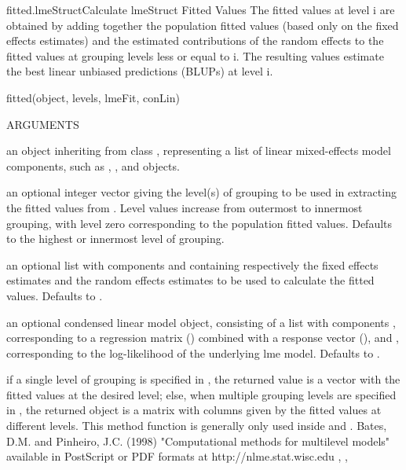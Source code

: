 \documentclass[pdftex]{article} \usepackage{url,graphicx}
\begin{document}
\begin{Helpfile}{fitted.lmeStruct}{Calculate lmeStruct Fitted Values}
The fitted values at level i are obtained by adding together the
population fitted values (based only on the fixed effects estimates)
and the estimated contributions of the random effects to the fitted
values at grouping levels less or equal to i. The resulting
values estimate the best linear unbiased predictions (BLUPs) at level
i.
\begin{Example}
fitted(object, levels, lmeFit, conLin)
\end{Example}
\begin{Argument}{ARGUMENTS}
\item[\Co{object:}]
an object inheriting from class ,
representing a list of linear mixed-effects model components, such as
, , and  objects.
\item[\Co{level:}]
an optional integer vector giving the level(s) of grouping
to be used in extracting the fitted values from . Level
values increase from outermost to innermost grouping, with
level zero corresponding to the population fitted values. Defaults to
the highest or innermost level of grouping.
\item[\Co{lmeFit:}]
an optional list with components  and 
containing respectively the fixed effects estimates and the random
effects estimates to be used to calculate the fitted values. Defaults
to .
\item[\Co{conLin:}]
an optional condensed linear model object, consisting of
a list with components , corresponding to a regression
matrix () combined with a response vector (), and 
, corresponding to the log-likelihood of the
underlying lme model. Defaults to .
\end{Argument}
if a single level of grouping is specified in ,
the returned value is a vector with the fitted values at the desired
level; else, when multiple grouping levels are specified in
, the returned object is a matrix with 
columns given by the fitted values at different levels.
 This method function is generally only used inside  and 
.
Bates, D.M. and Pinheiro, J.C. (1998) "Computational methods for
multilevel models" available in PostScript or PDF formats at
http://nlme.stat.wisc.edu
, ,
\end{Helpfile}
\end{document}
